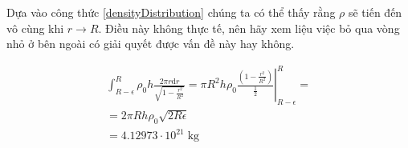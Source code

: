 \begin{solution}

Dựa vào công thức \eqref{densityDistribution} chúng ta có thể thấy rằng
$\rho$ sẽ tiến đến vô cùng khi $r \rightarrow R$. Điều này không thực tế, nên hãy xem liệu việc bỏ qua vòng nhỏ ở bên ngoài có giải quyết được vấn đề này hay không.

\begin{gather*}
    \int^{R}_{R - \epsilon} \rho_0 h \frac{2\pi r \mathrm{d} r}{
    \sqrt{1 - \frac{r ^ 2}{R ^ 2}}} = \pi R ^ 2 h \rho_0 \left.\frac{\left( 1
        - \frac{r^2}{R^2} \right)}{\frac{1}{2}}\right|^R_{R - \epsilon} = \\
     = 2 \pi R h \rho_0 \sqrt{2 R \epsilon} \\
     = 4.12973 \cdot 10 ^ {21} \; \mathrm{kg}
\end{gather*}

\end{solution}